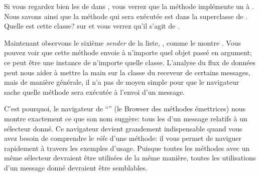 \documentclass[a4paper,10pt,twoside]{book}
\begin{document}
Si vous regardez bien les \senders de  dans \mbox{,} vous verrez que la méthode implémente un  à \super. Nous savons ainsi que la méthode qui sera exécutée est dans la superclasse de . Quelle est cette classe? \Actclickz sur  et vous verrez qu'il s'agit de .

Maintenant observons le sixième \emph{sender} de la liste,
, comme le montre .
Vous pouvez voir que cette méthode envoie  à n'importe quel objet 
passé en argument; ce peut être une instance de n'importe quelle classe.
L'analyse du flux de données peut nous aider à mettre la main sur la classe du 
receveur de certains messages, mais de manière générale, il n'a pas de moyen simple 
pour que le navigateur sache quelle méthode sera exécutée à l'envoi d'un message.

C'est pourquoi, le navigateur de ``\senders'' (\ie le Browser des
méthodes émettrices) nous montre exactement ce que son nom
suggère: tous  les \senders d'un message relatifs à un sélecteur donné. 
Ce navigateur devient grandement indispensable quand vous avez besoin
de comprendre le \emph{rôle} d'une méthode: il vous permet de
naviguer rapidement à travers les exemples d'usage. %
Puisque toutes les méthodes avec un même sélecteur devraient être utilisées de la même manière, toutes les utilisations d'un message donné devraient être semblables.

\end{document}
